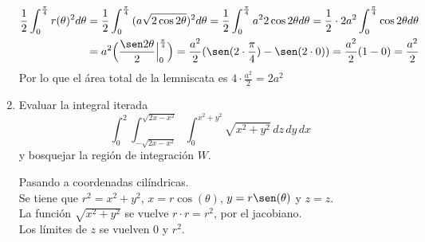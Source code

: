 \documentclass{article}
\begin{document}
\begin{enumerate}
{            \begin{align*}
                \frac{1}{2}\int_0^{\frac{\pi}{4}}{r(\theta)^2 d\theta}
                &= \frac{1}{2}\int_0^{\frac{\pi}{4}}{(a\sqrt{2\cos2\theta})^2 d\theta}
                = \frac{1}{2}\int_0^{\frac{\pi}{4}}{a^2 2\cos2\theta d\theta}
                = \frac{1}{2}\cdot 2a^2 \int_0^{\frac{\pi}{4}}{\cos2\theta d\theta}\\
                &= a^2 \Big (\frac{\sen 2\theta}{2} \Big |_0^{\frac{\pi}{4}} \Big )
                = \frac{a^2}{2} (\sen (2\cdot\frac{\pi}{4}) - \sen (2\cdot0))
                = \frac{a^2}{2} (1-0) = \frac{a^2}{2}
            \end{align*}
            Por lo que el área total de la lemniscata es
            $4 \cdot \frac{a^2}{2} = 2a^2$
        }

        \item {
            Evaluar la integral iterada
            \[
                \int_{0}^{2}{
                    \int_{-\sqrt{2x-x^2}}^{\sqrt{2x-x^2}}{
                        \int_{0}^{x^2+y^2}{
                            \sqrt{x^2+y^2}
                        \,dz}
                    \,dy}
                \,dx}
            \]
            y bosquejar la región de integración $W$.

            \color{azul}
            Pasando a coordenadas cilíndricas.\\
            Se tiene que $r^2 = x^2 + y^2$, $x = r\cos(\theta)$,
            $y = r\sen(\theta)$
            y $z = z$.\\
            La función $\sqrt{x^2+y^2}$ se vuelve $r \cdot r = r^2$, por el
            jacobiano.\\
            Los límites de $z$ se vuelven 0 y $r^2$.

}
\end{enumerate}
\end{document}
